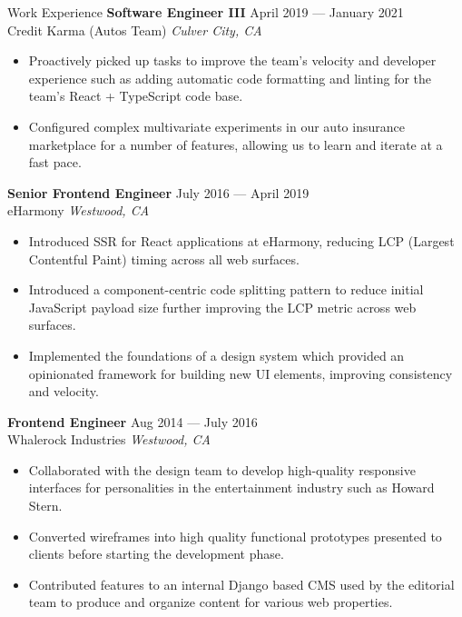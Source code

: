 \documentclass{resume} %
\begin{document}
\begin{rSection}{Work Experience}
\textbf{Software Engineer III} \hfill April 2019 --- January 2021 \\
Credit Karma (Autos Team) \hfill \textit{Culver City, CA}
\begin{itemize}
    \item Proactively picked up tasks to improve the team's velocity and developer experience such as adding automatic code formatting and linting for the team's React + TypeScript code base.
    \item Configured complex multivariate experiments in our auto insurance marketplace for a number of features, allowing us to learn and iterate at a fast pace.
\end{itemize}

\textbf{Senior Frontend Engineer} \hfill July 2016 --- April 2019 \\
eHarmony \hfill \textit{Westwood, CA}
\begin{itemize}
    \item Introduced SSR for React applications at eHarmony, reducing LCP (Largest Contentful Paint) timing across all web surfaces.
    \item Introduced a component-centric code splitting pattern to reduce initial JavaScript payload size further improving the LCP metric across web surfaces.
    \item Implemented the foundations of a design system which provided an opinionated framework for building new UI elements, improving consistency and velocity.
\end{itemize}

\textbf{Frontend Engineer} \hfill Aug 2014 --- July 2016 \\
Whalerock Industries \hfill \textit{Westwood, CA}
\begin{itemize}
    \item Collaborated with the design team to develop high-quality responsive interfaces for personalities in the entertainment industry such as Howard Stern.
    \item Converted wireframes into high quality functional prototypes presented to clients before starting the development phase.
    \item Contributed features to an internal Django based CMS used by the editorial team to produce and organize content for various web properties.
\end{itemize}

\end{rSection} 
\end{document}
